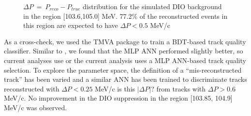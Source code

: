 \begin{figure}
  \caption{
    \label{fig:dio_delta_p_1036_1050} 
    $\Delta P ~=~ P_{reco} -P_{true}$ distribution for {\blue the} simulated DIO background in the region [103.6,105.0] MeV.
    77.2\% of {\blue the} reconstructed events in this region are expected to have $\Delta P < 0.5$ MeV/c
  }
\end{figure}

As a cross-check, we used the TMVA package to train a BDT-based track quality classifier.
Similar to \cite{MU2E_33150_ANN_TRAINING}, we found that the MLP ANN performed slightly better,
so  {\blue current analyses use or the current analysis uses} a MLP ANN-based track quality selection.
To explore the parameter space, the definition of a ``mis-reconstructed track'' has been varied and
a similar ANN has been trained to discriminate tracks reconstructed with $\Delta{P} < 0.25$ MeV/c {\blue is this $|\Delta{P}|$?}
from tracks with $\Delta{P} > 0.6$ MeV/c. No improvement in the DIO
suppression in the region [103.85, 104.9] MeV/c was observed. 

\newpage
